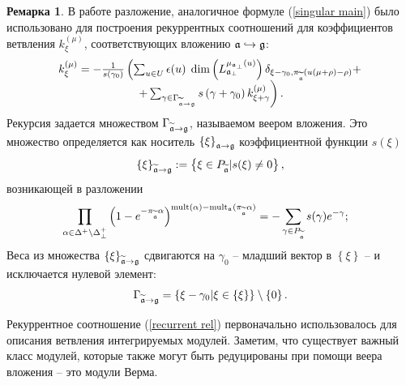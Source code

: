 \documentclass[12pt]{article}
\theoremstyle{definition}
\newtheorem{remark}{Ремарка}
\begin{document}
\begin{remark}

В работе \cite{2010arXiv1007.0318L} разложение, аналогичное формуле (\ref{singular main}) было использовано для построения рекуррентных соотношений для коэффициентов ветвления $k_{\xi}^{\left( \mu \right) }$, соответствующих вложению  $\frak{a}\hookrightarrow \frak{g}$:
\begin{equation}
\begin{array}{c}
k_{\xi }^{\left( \mu \right) }=-\frac{1}{s\left( \gamma _{0}\right) }\left(
\sum_{u\in U}\epsilon (u)\;\dim \left( L_{\frak{a}_{\perp }}^{\mu _{\frak{a}%
_{\perp }}\left( u\right) }\right) \delta _{\xi -\gamma _{0},\pi _{%
\widetilde{\frak{a}}}(u(\mu +\rho )-\rho )}+\right.  \\
\left. +\sum_{\gamma \in \Gamma _{\widetilde{\frak{a}}\rightarrow \frak{g}%
}}s\left( \gamma +\gamma _{0}\right) k_{\xi +\gamma }^{\left( \mu \right)
}\right) .
\end{array}
\label{recurrent rel}
\end{equation}
Рекурсия задается множеством  $\Gamma _{\widetilde{\frak{a}}\rightarrow \frak{g}}$, называемом веером вложения. Это множество определяется как носитель  $\left\{ \xi \right\}_{\frak{a}\rightarrow \frak{g}}$  коэффициентной функции $s(\xi )$
\begin{equation*}
\left\{ \xi \right\} _{\widetilde{\frak{a}}\rightarrow \frak{g}}:=\left\{
\xi \in P_{\widetilde{\frak{a}}}|s(\xi )\neq 0\right\},
\end{equation*}
возникающей в разложении 
\begin{equation}
\prod_{\alpha \in \Delta ^{+}\setminus \Delta _{\bot }^{+}}\left( 1-e^{-\pi
_{\widetilde{\frak{a}}}\alpha }\right) ^{\mathrm{mult}(\alpha )-\mathrm{mult}%
_{\frak{a}}(\pi _{\widetilde{\frak{a}}}\alpha )}=-\sum_{\gamma \in P_{%
\widetilde{\frak{a}}}}s(\gamma )e^{-\gamma };\quad
\end{equation}
Веса из множества $\left\{ \xi \right\} _{\widetilde{\frak{a}}\rightarrow \frak{%
g}}$ сдвигаются на $\gamma _{0}$ -- младший вектор в $\left\{ \xi
\right\} $ -- и исключается нулевой элемент:
\begin{equation}
\Gamma _{\widetilde{\frak{a}}\rightarrow \frak{g}}=\left\{ \xi -\gamma
_{0}|\xi \in \left\{ \xi \right\} \right\} \setminus \left\{ 0\right\} .
\end{equation}

Рекуррентное соотношение (\ref{recurrent rel}) первоначально использовалось для описания ветвления интегрируемых модулей. Заметим, что существует важный класс модулей, которые также могут быть редуцированы при помощи веера вложения -- это модули Верма.
\end{remark}
\end{document}
